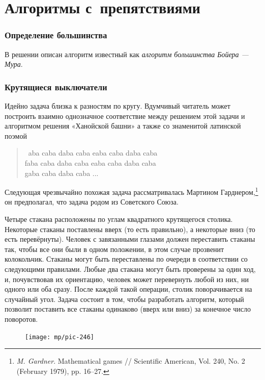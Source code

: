 \documentclass[twoside]{book}
\begin{document}
\section{Алгоритмы с~препятствиями}

\subsubsection*{Определение большинства}
В решении описан алгоритм известный как \emph{алгоритм большинства Бойера --- Мура}. 


\subsubsection*{Крутящиеся выключатели}
Идейно задача близка к разностям по кругу.
Вдумчивый читатель может построить взаимно однозначное соответствие между решением этой задачи и алгоритмом решения «Ханойской башни» а также со знаменитой латинской поэмой
\begin{verse}
\ aba caba daba caba eaba caba daba caba\\
faba caba daba caba eaba caba daba caba\\
gaba caba daba caba ...
\end{verse}


Следующая чрезвычайно похожая задача рассматривалась Мартином Гарднером,\footnote{
\emph{M. Gardner}.
Mathematical games /\!/ Scientific American, Vol. 240, No. 2 (February 1979), pp. 16--27.}
он предполагал, что задача родом из Советского Союза. 

Четыре стакана расположены по углам квадратного крутящегося столика.
Некоторые стаканы поставлены вверх (то есть правильно), а некоторые вниз (то есть перевёрнуты). Человек с завязанными глазами должен переставить стаканы так, чтобы все они были в одном положении, в этом случае прозвенит колокольчик.
Стаканы могут быть переставлены по очереди в соответствии со следующими правилами.
Любые два стакана могут быть проверены за один ход, и, почувствовав их ориентацию, человек может перевернуть любой из них, ни одного или оба сразу.
После каждой такой операции, столик поворачивается на случайный угол.
Задача состоит в том, чтобы разработать алгоритм, который позволит 
поставить все стаканы одинаково (вверх или вниз) за конечное число поворотов.

\begin{figure}
\vskip-4mm
\centering
\texttt{[image: mp/pic-246]}
\end{figure}
\end{document}
